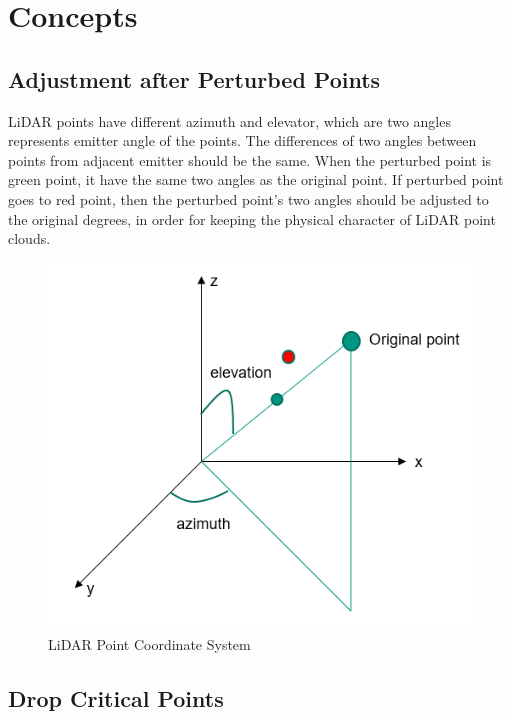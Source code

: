 
\chapter{Concepts}
\label{sec:concepts}





 \section{Adjustment after Perturbed Points}
 
 LiDAR points have different azimuth and elevator, which are two angles represents emitter angle of the points. The differences of two angles between points from adjacent emitter should be the same. When the perturbed point is green point, it have the same two angles as the original point. If perturbed point goes to red point, then the perturbed point's two angles should be adjusted to the original degrees, in order for keeping the physical character of LiDAR point clouds.
 \begin{figure}[!htbp]
\centering
\includegraphics[scale=0.5]{Graphics/Adjustment.png}
\caption{LiDAR Point Coordinate System}
\label{fig:Adjustment}
\end{figure}

\section{Drop Critical Points}


